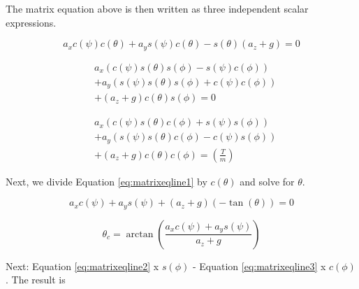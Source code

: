 The matrix equation above is then written as three independent scalar expressions.




\begin{equation}
    \label{eq:matrixeqline1}
    a_x c(\psi) c(\theta) + a_y s(\psi) c(\theta) - s(\theta)( a_z + g ) = 0
\end{equation}

\begin{equation}
    \label{eq:matrixeqline2}
    \begin{split}
    & a_x (c(\psi) s(\theta) s(\phi) - s(\psi) c(\phi))\\ 
    &+ a_y (s(\psi) s(\theta) s(\phi) + c(\psi) c(\phi))\\ 
    &+ ( a_z + g )c(\theta) s(\phi) = 0
\end{split}    
\end{equation}

\begin{equation}
    \label{eq:matrixeqline3}
    \begin{split}    
    & a_x (c(\psi) s(\theta) c(\phi) + s(\psi) s(\phi))\\ 
    &+ a_y (s(\psi) s(\theta) c(\phi) - c(\psi) s(\phi))\\ 
    &+ ( a_z + g )c(\theta) c(\phi) = (\frac{T}{m})
\end{split}
\end{equation}


Next, we divide Equation \eqref{eq:matrixeqline1} by $c(\theta)$ and solve for $\theta$.

\begin{equation}
a_x c(\psi) + a_y s(\psi) + (a_z+g)(-\tan(\theta)) = 0
\end{equation}


\begin{equation}
    \label{eq:thetac}
    \theta_c = \arctan( \frac{a_x c(\psi) + a_y s(\psi)}{a_z+g} )
\end{equation}


Next: Equation \eqref{eq:matrixeqline2} x $ s(\phi) $ - Equation \eqref{eq:matrixeqline3} x $ c(\phi) $. The result is

